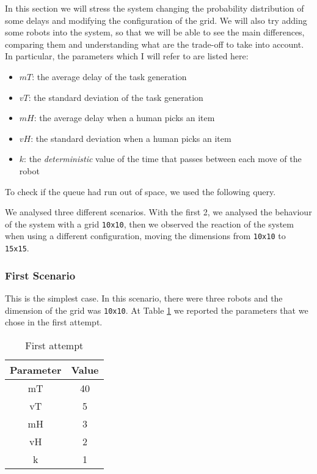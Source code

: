 In this section we will stress the system changing the probability distribution of some delays and modifying the configuration of the grid. We will also try adding some robots into the system, so that we will be able to see the main differences, comparing them and understanding what are the trade-off to take into account. In particular, the parameters which I will refer to are listed here:
\begin{itemize}
    \item ${mT}$: the average delay of the task generation
    \item ${vT}$: the standard deviation of the task generation
    \item ${mH}$: the average delay when a human picks an item
    \item ${vH}$: the standard deviation when a human picks an item
    \item ${k}$: the \emph{deterministic} value of the time that passes between each move of the robot
\end{itemize}

To check if the queue had run out of space, we used the following query. \query

We analysed three different scenarios. With the first 2, we analysed the behaviour of the system with a grid \texttt{10x10}, then we observed the reaction of the system when using a different configuration, moving the dimensions from \texttt{10x10} to \texttt{15x15}.

\subsubsection{First Scenario}
This is the simplest case. In this scenario, there were three robots and the dimension of the grid was \texttt{10x10}. At Table \ref{tab:firstattempt} we reported the parameters that we chose in the first attempt.

\begin{table}[h]
\centering
    \begin{tabular}{|c c|} 
        \hline
        Parameter & Value \\ [0.5ex] 
        \hline\hline
        mT & 40 \\
        vT & 5 \\
        mH & 3 \\
        vH & 2 \\
        k & 1 \\ [0.5ex] 
        \hline
    \end{tabular}
    \caption{First attempt}
    \label{tab:firstattempt}
\end{table}

